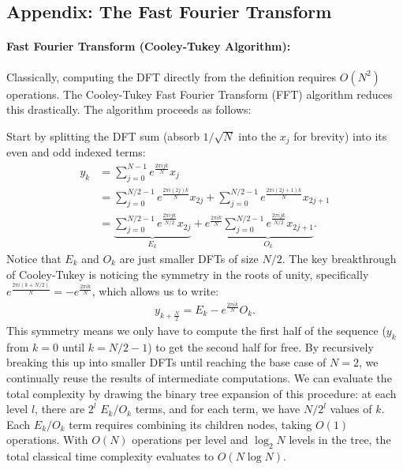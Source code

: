\subsection{Appendix: The Fast Fourier Transform}
\paragraph{Fast Fourier Transform (Cooley-Tukey Algorithm):} Classically, computing the DFT directly from the definition requires $O(N^2)$ operations. The Cooley-Tukey Fast Fourier Transform (FFT) algorithm reduces this drastically. The algorithm proceeds as follows:

Start by splitting the DFT sum (absorb $1/\sqrt{N}$ into the $x_j$ for brevity) into its even and odd indexed terms:
\begin{align*}
    y_k &= \sum_{j=0}^{N-1} e^{\frac{2\pi i jk}{N}} x_j\\
    &= \sum_{j=0}^{N/2-1} e^{\frac{2\pi i (2j)k}{N}} x_{2j} + \sum_{j=0}^{N/2-1} e^{\frac{2\pi i (2j+1)k}{N}} x_{2j+1}\\
    &= \underbrace{\sum_{j=0}^{N/2-1} e^{\frac{2\pi i jk}{N/2}} x_{2j}}_{E_k} + e^{\frac{2\pi ik}{N}}\underbrace{\sum_{j=0}^{N/2-1} e^{\frac{2\pi i jk}{N/2}} x_{2j+1}}_{O_k}.
\end{align*}
Notice that $E_k$ and $O_k$ are just smaller DFTs of size $N/2$. The key breakthrough of Cooley-Tukey is noticing the symmetry in the roots of unity, specifically $e^{\frac{2\pi i(k+N/2)}{N}} = -e^{\frac{2\pi ik}{N}}$, which allows us to write:
\begin{align*}
    y_{k+\frac{N}{2}} = E_k - e^{\frac{2\pi ik}{N}}O_k.
\end{align*}
This symmetry means we only have to compute the first half of the sequence ($y_k$ from $k=0$ until $k=N/2-1$) to get the second half for free. By recursively breaking this up into smaller DFTs until reaching the base case of $N=2$, we continually reuse the results of intermediate computations. We can evaluate the total complexity by drawing the binary tree expansion of this procedure: at each level $l$, there are $2^l$ $E_k/O_k$ terms, and for each term, we have $N/2^l$ values of $k$. Each $E_k/O_k$ term requires combining its children nodes, taking $O(1)$ operations. With $O(N)$ operations per level and $\log_2 N$ levels in the tree, the total classical time complexity evaluates to $O(N \log N)$.







